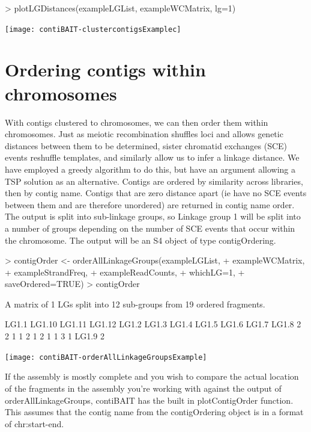 \documentclass{article}
\begin{document}
\begin{Schunk}
\begin{Sinput}
> plotLGDistances(exampleLGList, exampleWCMatrix, lg=1)
\end{Sinput}
\end{Schunk}
\texttt{[image: contiBAIT-clustercontigsExamplec]}


\section{Ordering contigs within chromosomes}

With contigs clustered to chromosomes, we can then order them within chromosomes. Just as meiotic recombination shuffles loci and allows genetic distances between them to be determined, sister chromatid exchanges (SCE) events reshuffle templates, and similarly allow us to infer a linkage distance. We have employed a greedy algorithm to do this, but have an argument allowing a TSP solution as an alternative. Contigs are ordered by similarity across libraries, then by contig name. Contigs that are zero distance apart (ie have no SCE events between them and are therefore unordered) are returned in contig name order. The output is split into sub-linkage groups, so Linkage group 1 will be split into a number of groups depending on the number of SCE events that occur within the chromosome. The output will be an S4 object of type contigOrdering.

\begin{Schunk}
\begin{Sinput}
> contigOrder <- orderAllLinkageGroups(exampleLGList,
+ exampleWCMatrix,
+ exampleStrandFreq,
+ exampleReadCounts,
+ whichLG=1,
+ saveOrdered=TRUE)
> contigOrder
\end{Sinput}
\begin{Soutput}
A matrix of 1 LGs split into 12 sub-groups from 19 ordered fragments.

 LG1.1 LG1.10 LG1.11 LG1.12  LG1.2  LG1.3  LG1.4  LG1.5  LG1.6  LG1.7  LG1.8 
     2      2      1      1      2      1      2      1      1      3      1 
 LG1.9 
     2 
\end{Soutput}
\end{Schunk}
\texttt{[image: contiBAIT-orderAllLinkageGroupsExample]}

If the assembly is mostly complete and you wish to compare the actual location of the fragments in the assembly you're working with against the output of orderAllLinkageGroups, contiBAIT has the built in plotContigOrder function. This assumes that the contig name from the contigOrdering object is in a format of chr:start-end.
\end{document}
